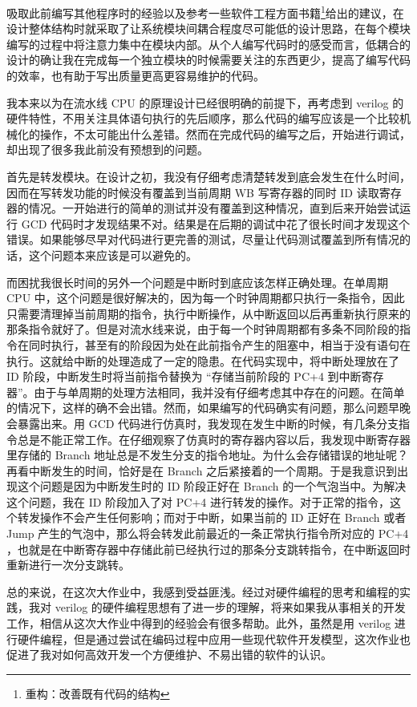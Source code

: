 \documentclass[a4paper]{article}
\begin{document}
吸取此前编写其他程序时的经验以及参考一些软件工程方面书籍\footnote{重构：改善既有代码的结构}给出的建议，在设计整体结构时就采取了让系统模块间耦合程度尽可能低的设计思路，在每个模块编写的过程中将注意力集中在模块内部。从个人编写代码时的感受而言，低耦合的设计的确让我在完成每一个独立模块的时候需要关注的东西更少，提高了编写代码的效率，也有助于写出质量更高更容易维护的代码。

我本来以为在流水线 CPU 的原理设计已经很明确的前提下，再考虑到 verilog 的硬件特性，不用关注具体语句执行的先后顺序，那么代码的编写应该是一个比较机械化的操作，不太可能出什么差错。然而在完成代码的编写之后，开始进行调试，却出现了很多我此前没有预想到的问题。

首先是转发模块。在设计之初，我没有仔细考虑清楚转发到底会发生在什么时间，因而在写转发功能的时候没有覆盖到当前周期 WB 写寄存器的同时 ID 读取寄存器的情况。一开始进行的简单的测试并没有覆盖到这种情况，直到后来开始尝试运行 GCD 代码时才发现结果不对。结果是在后期的调试中花了很长时间才发现这个错误。如果能够尽早对代码进行更完善的测试，尽量让代码测试覆盖到所有情况的话，这个问题本来应该是可以避免的。

而困扰我很长时间的另外一个问题是中断时到底应该怎样正确处理。在单周期 CPU 中，这个问题是很好解决的，因为每一个时钟周期都只执行一条指令，因此只需要清理掉当前周期的指令，执行中断操作，从中断返回以后再重新执行原来的那条指令就好了。但是对流水线来说，由于每一个时钟周期都有多条不同阶段的指令在同时执行，甚至有的阶段因为处在此前指令产生的阻塞中，相当于没有语句在执行。这就给中断的处理造成了一定的隐患。在代码实现中，将中断处理放在了 ID 阶段，中断发生时将当前指令替换为 ``存储当前阶段的 PC+4 到中断寄存器''。由于与单周期的处理方法相同，我并没有仔细考虑其中存在的问题。在简单的情况下，这样的确不会出错。然而，如果编写的代码确实有问题，那么问题早晚会暴露出来。用 GCD 代码进行仿真时，我发现在发生中断的时候，有几条分支指令总是不能正常工作。在仔细观察了仿真时的寄存器内容以后，我发现中断寄存器里存储的 Branch 地址总是不发生分支的指令地址。为什么会存储错误的地址呢？再看中断发生的时间，恰好是在 Branch 之后紧接着的一个周期。于是我意识到出现这个问题是因为中断发生时的 ID 阶段正好在 Branch 的一个气泡当中。为解决这个问题，我在 ID 阶段加入了对 PC+4 进行转发的操作。对于正常的指令，这个转发操作不会产生任何影响；而对于中断，如果当前的 ID 正好在 Branch 或者 Jump 产生的气泡中，那么将会转发此前最近的一条正常执行指令所对应的 PC+4 ，也就是在中断寄存器中存储此前已经执行过的那条分支跳转指令，在中断返回时重新进行一次分支跳转。

总的来说，在这次大作业中，我感到受益匪浅。经过对硬件编程的思考和编程的实践，我对 verilog 的硬件编程思想有了进一步的理解，将来如果我从事相关的开发工作，相信从这次大作业中得到的经验会有很多帮助。此外，虽然是用 verilog 进行硬件编程，但是通过尝试在编码过程中应用一些现代软件开发模型，这次作业也促进了我对如何高效开发一个方便维护、不易出错的软件的认识。
\end{document}
